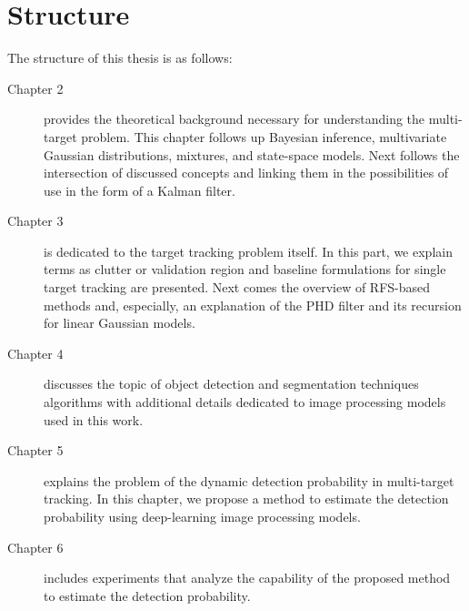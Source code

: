\section{Structure}
The structure of this thesis is as follows:
\begin{description}
  \item[Chapter 2] provides the theoretical background necessary for understanding the multi-target problem.
  This chapter follows up Bayesian inference, multivariate Gaussian distributions, mixtures, and state-space models.
  Next follows the intersection of discussed concepts and linking them in the possibilities of use in the form of \linebreak a
  Kalman filter.

  \item[Chapter 3] is dedicated to the target tracking problem itself. In this part, we explain terms as clutter or
  validation region and baseline formulations for single target tracking are presented. Next comes the overview of
  RFS-based
  methods and, especially, \linebreak an explanation of the PHD filter and its recursion for linear Gaussian models.

  \item[Chapter 4] discusses the topic of object detection and segmentation techniques algorithms with additional
  details
  dedicated to image processing models used in this work.

  \item[Chapter 5] explains the problem of the dynamic detection probability in multi-target tracking. In this
  chapter, we
  propose a method to estimate the detection probability using deep-learning image processing models.
  \item[Chapter 6] includes experiments that analyze the capability of the proposed method to estimate the detection
  probability.
\end{description}

